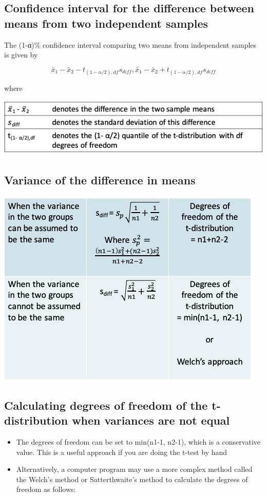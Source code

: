 \documentclass[
]{book}
\providecommand{\tightlist}{%
  \setlength{\itemsep}{0pt}\setlength{\parskip}{0pt}}
\begin{document}
\hypertarget{confidence-interval-for-the-difference-between-means-from-two-independent-samples}{%
\subsection{Confidence interval for the difference between means from two independent samples}\label{confidence-interval-for-the-difference-between-means-from-two-independent-samples}}

The (1-α)\% confidence interval comparing two means from independent samples is given by

\[\bar x_1-\bar x_2-t_{(1-\alpha/2),df}s_{diff},\bar x_1-\bar x_2+t_{(1-\alpha/2),df}s_{diff}\]

where

\includegraphics[width=0.5\linewidth]{./3_56}

\hypertarget{variance-of-the-difference-in-means}{%
\subsection{Variance of the difference in means}\label{variance-of-the-difference-in-means}}

\includegraphics[width=0.5\linewidth]{./3_57}

\hypertarget{calculating-degrees-of-freedom-of-the-t-distribution-when-variances-are-not-equal}{%
\subsection{Calculating degrees of freedom of the t-distribution when variances are not equal}\label{calculating-degrees-of-freedom-of-the-t-distribution-when-variances-are-not-equal}}

\begin{itemize}
\tightlist
\item
  The degrees of freedom can be set to min(n1-1, n2-1), which is a conservative value. This is a useful approach if you are doing the t-test by hand
\item
  Alternatively, a computer program may use a more complex method called the Welch's method or Satterthwaite's method to calculate the degrees of freedom as follows:
\end{itemize}
\end{document}
